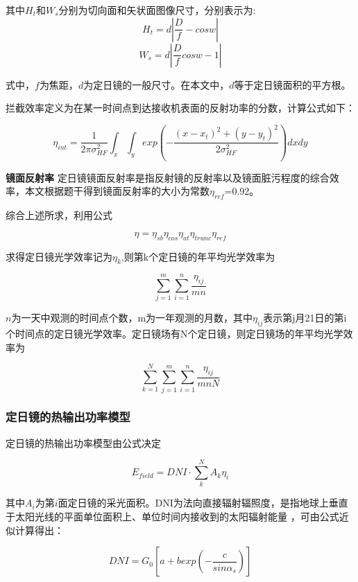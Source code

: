 \documentclass[withoutpreface,bwprint]{cumcmthesis} %
\begin{document}
其中$H_t$和$W_s$分别为切向面和矢状面图像尺寸，分别表示为:
$$H_{t}=d\left|\frac{D}{f}-cosw\right|$$
$$W_{s}=d\left|\frac{D}{f}cosw-1\right|$$

式中，$f$为焦距，$d$为定日镜的一般尺寸。在本文中，$d$等于定日镜面积的平方根。

拦截效率定义为在某一时间点到达接收机表面的反射功率的分数，计算公式如下：

\begin{equation}
    \eta_{int}=\frac{1}{2\pi\sigma^2_{HF}}\int_{x}\int_{y}exp(-\frac{(x-x_{t})^2+(y-y_{t})^2}{2\sigma^2_{HF}})dxdy
\end{equation}

\textbf{镜面反射率} \space 定日镜镜面反射率是指反射镜的反射率以及镜面脏污程度的综合效率，本文根据题干得到镜面反射率的大小为常数$\eta_{ref}$=0.92。

综合上述所求，利用公式

\begin{equation}
    \eta=\eta_{sb}\eta_{cos}\eta_{at}\eta_{trunc}\eta_{ref}
\end{equation}

求得定日镜光学效率记为$\eta_{k}$,则第k个定日镜的年平均光学效率为

\begin{equation}
    \sum^{m}_{j=1}\sum^{n}_{i=1}\frac{\eta_{ij}}{mn}
\end{equation}

$n$为一天中观测的时间点个数，m为一年观测的月数，其中$\eta_{ij}$表示第j月21日的第i个时间点的定日镜光学效率。定日镜场有N个定日镜，则定日镜场的年平均光学效率为

\begin{equation}
    \sum^{N}_{k=1}\sum^{m}_{j=1}\sum^{n}_{i=1}\frac{\eta_{ij}}{mnN}
\end{equation}

\subsubsection{定日镜的热输出功率模型}

定日镜的热输出功率模型由公式决定

\begin{equation}
    E_{field}=DNI\cdot\sum^{N}_{k}A_{k}\eta_{i}
\end{equation}

其中$A_{i}$为第$i$面定日镜的采光面积。DNI为法向直接辐射辐照度，是指地球上垂直于太阳光线的平面单位面积上、单位时间内接收到的太阳辐射能量 ，可由公式近似计算得出：

\begin{equation}
    DNI=G_{0}[a+b exp(-\frac{c}{sin\alpha_{s}})] \end{equation}
\end{document}
